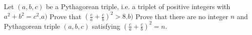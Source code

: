 Let $(a,b,c)$ be a Pythagorean triple, i.e. a triplet of positive integers with $ a^2+b^2=c^2$.$a)$ Prove that $\left(\frac{c}{a}+\frac{c}{b}\right)^2>8$.$b)$ Prove that there are no integer $n$ and Pythagorean triple $(a,b,c)$ satisfying $\left(\frac{c}{a}+\frac{c}{b}\right)^2=n$.